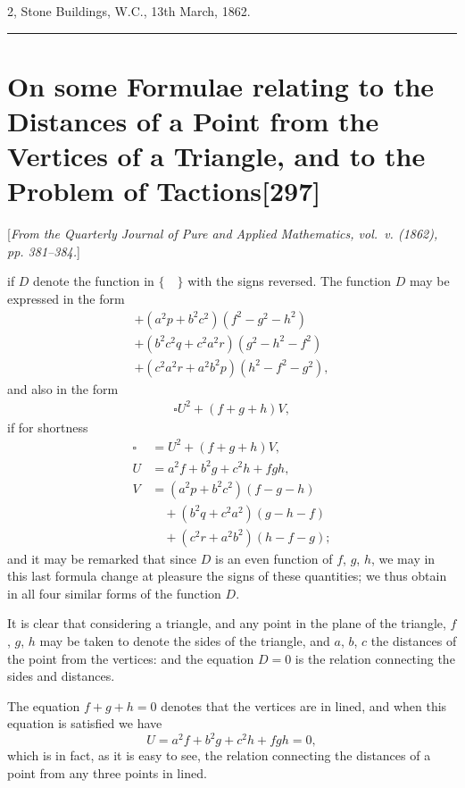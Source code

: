 \documentclass[11pt,a4paper]{article}
\newcommand{\paper}[2]{\section[#1]{#1\hfill\textnormal{[#2]}}}
\begin{document}
\begin{flushright}
2, Stone Buildings, W.C., 13th March, 1862.
\end{flushright}

\vspace{1.5em}
\hrule
\vspace{1.5em}

\paper{On some Formulae relating to the Distances of a Point from the Vertices of a Triangle, and to the Problem of Tactions}{297}

{\small
[\textit{From the Quarterly Journal of Pure and Applied Mathematics, vol.~v. (1862), pp. 381--384.}]
\par}
\vspace{0.5em}

\setcounter{page}{511}

if $D$ denote the function in $\{\quad\}$ with the signs reversed. The function $D$ may be expressed in the form
\begin{multline*}
+ (a^2p + b^2c^2)(f^2 - g^2 - h^2)\\
+ (b^2c^2q + c^2a^2r)(g^2 - h^2 - f^2)\\
+ (c^2a^2r + a^2b^2p)(h^2 - f^2 - g^2),
\end{multline*}
and also in the form
\begin{multline*}
\square U^2 + (f+g+h)V,
\end{multline*}
if for shortness
\begin{align*}
\square &= U^2 + (f+g+h)V,\\
U &= a^2f + b^2g + c^2h + fgh,\\
V &= (a^2p + b^2c^2)(f-g-h)\\
&\quad + (b^2q + c^2a^2)(g-h-f)\\
&\quad + (c^2r + a^2b^2)(h-f-g);
\end{align*}
and it may be remarked that since $D$ is an even function of $f$, $g$, $h$, we may in this last formula change at pleasure the signs of these quantities; we thus obtain in all four similar forms of the function $D$.

It is clear that considering a triangle, and any point in the plane of the triangle, $f$, $g$, $h$ may be taken to denote the sides of the triangle, and $a$, $b$, $c$ the distances of the point from the vertices: and the equation $D = 0$ is the relation connecting the sides and distances.

The equation $f+g+h=0$ denotes that the vertices are in lined, and when this equation is satisfied we have
\[
U = a^2f + b^2g + c^2h + fgh = 0,
\]
which is in fact, as it is easy to see, the relation connecting the distances of a point from any three points in lined.
\end{document}
